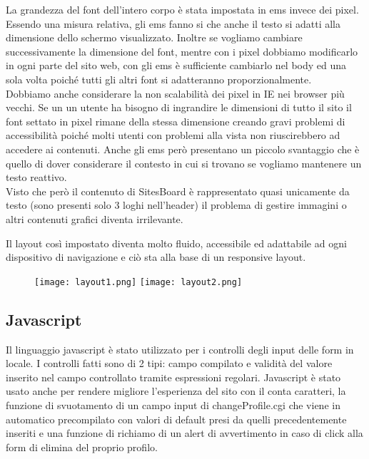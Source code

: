 \documentclass[12pt]{article}
\begin{document}
	La grandezza del font dell'intero corpo è stata impostata in ems invece dei pixel.
	Essendo una misura relativa, gli ems fanno si che anche il testo si adatti alla dimensione dello schermo visualizzato. Inoltre se vogliamo cambiare successivamente la dimensione del font, mentre con i pixel dobbiamo modificarlo in ogni parte del sito web, con gli ems è sufficiente cambiarlo nel body ed una sola volta poiché tutti gli altri font si adatteranno proporzionalmente.\\
	Dobbiamo anche considerare la non scalabilità dei pixel in IE nei browser più vecchi. Se un un utente ha bisogno di ingrandire le dimensioni di tutto il sito il font settato in pixel rimane della stessa dimensione creando gravi problemi di accessibilità poiché molti utenti con problemi alla vista non riuscirebbero ad accedere ai contenuti.
	Anche gli ems però presentano un piccolo svantaggio che è quello di dover considerare il contesto in cui si trovano se vogliamo mantenere un testo reattivo.\\ Visto che però il contenuto di SitesBoard è rappresentato quasi unicamente da testo (sono presenti solo 3 loghi nell'header) il problema di gestire immagini o altri contenuti grafici diventa irrilevante.
	
	Il layout così impostato diventa molto fluido, accessibile ed adattabile ad ogni dispositivo di navigazione e ciò sta alla base di un responsive layout.
	
	\newpage
	
	
	\begin{figure}
	\texttt{[image: layout1.png]}
	\texttt{[image: layout2.png]}
	\hspace{1.5in}
	\end{figure}
	
	\subsection{Javascript}
	
	Il linguaggio javascript è stato utilizzato per i controlli degli input delle form in locale.
	I controlli fatti sono di 2 tipi: campo compilato e validità del valore inserito nel campo controllato tramite espressioni regolari.
	Javascript è stato usato anche per rendere migliore l'esperienza del sito con il conta caratteri, la funzione di svuotamento di un campo input di changeProfile.cgi che viene in automatico precompilato con valori di default presi da quelli precedentemente inseriti e una funzione di richiamo di un alert di avvertimento in caso di click alla form di elimina del proprio profilo.
	
\end{document}
